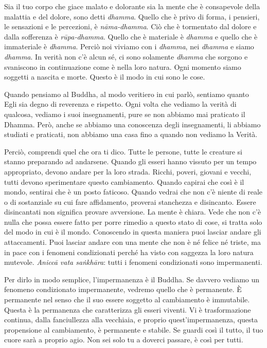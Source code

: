 Sia il tuo corpo che giace malato e dolorante sia la mente che è
consapevole della malattia e del dolore, sono detti \emph{dhamma}.
Quello che è privo di forma, i pensieri, le sensazioni e le percezioni,
è \emph{nāma‑dhamma}. Ciò che è tormentato dal dolore e dalla sofferenza
è \emph{rūpa‑dhamma}. Quello che è materiale è \emph{dhamma} e quello
che è immateriale è \emph{dhamma}. Perciò noi viviamo con i
\emph{dhamma}, nei \emph{dhamma} e siamo \emph{dhamma}. In verità non
c'è alcun sé, ci sono solamente \emph{dhamma} che sorgono e svaniscono
in continuazione come è nella loro natura. Ogni momento siamo soggetti a
nascita e morte. Questo è il modo in cui sono le cose.

Quando pensiamo al Buddha, al modo veritiero in cui parlò, sentiamo
quanto Egli sia degno di reverenza e rispetto. Ogni volta che vediamo la
verità di qualcosa, vediamo i suoi insegnamenti, pure se non abbiamo mai
praticato il Dhamma. Però, anche se abbiamo una conoscenza degli
insegnamenti, li abbiamo studiati e praticati, non abbiamo una casa fino
a quando non vediamo la Verità.

Perciò, comprendi quel che ora ti dico. Tutte le persone, tutte le
creature si stanno preparando ad andarsene. Quando gli esseri hanno
vissuto per un tempo appropriato, devono andare per la loro strada.
Ricchi, poveri, giovani e vecchi, tutti devono sperimentare questo
cambiamento. Quando capirai che così è il mondo, sentirai che è un posto
faticoso. Quando vedrai che non c'è niente di reale o di sostanziale su
cui fare affidamento, proverai stanchezza e disincanto. Essere
disincantati non significa provare avversione. La mente è chiara. Vede
che non c'è nulla che possa essere fatto per porre rimedio a questo
stato di cose, si tratta solo del modo in cui è il mondo. Conoscendo in
questa maniera puoi lasciar andare gli attaccamenti. Puoi lasciar andare
con una mente che non è né felice né triste, ma in pace con i fenomeni
condizionati perché ha visto con saggezza la loro natura mutevole.
\emph{Aniccā vata saṅkhāra}: tutti i fenomeni condizionati sono
impermanenti.

Per dirlo in modo semplice, l'impermanenza è il Buddha. Se davvero
vediamo un fenomeno condizionato impermanente, vedremo quello che è
permanente. È permanente nel senso che il suo essere soggetto al
cambiamento è immutabile. Questa è la permanenza che caratterizza gli
esseri viventi. Vi è trasformazione continua, dalla fanciullezza alla
vecchiaia, e proprio quest'impermanenza, questa propensione al
cambiamento, è permanente e stabile. Se guardi così il tutto, il tuo
cuore sarà a proprio agio. Non sei solo tu a doverci passare, è così per
tutti.

